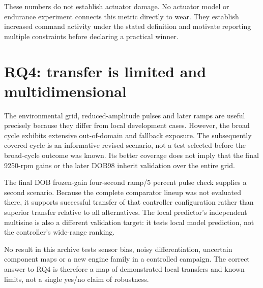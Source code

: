 These numbers do not establish actuator damage. No actuator model or endurance experiment connects this metric directly to wear. They establish increased command activity under the stated definition and motivate reporting multiple constraints before declaring a practical winner.

\section{RQ4: transfer is limited and multidimensional}
The environmental grid, reduced-amplitude pulses and later ramps are useful precisely because they differ from local development cases. However, the broad cycle exhibits extensive out-of-domain and fallback exposure. The subsequently covered cycle is an informative revised scenario, not a test selected before the broad-cycle outcome was known. Its better coverage does not imply that the final 9250-rpm gains or the later DOB98 inherit validation over the entire grid.

The final DOB frozen-gain four-second ramp/5 percent pulse check supplies a second scenario. Because the complete comparator lineup was not evaluated there, it supports successful transfer of that controller configuration rather than superior transfer relative to all alternatives. The local predictor's independent multisine is also a different validation target: it tests local model prediction, not the controller's wide-range ranking.

No result in this archive tests sensor bias, noisy differentiation, uncertain component maps or a new engine family in a controlled campaign. The correct answer to RQ4 is therefore a map of demonstrated local transfers and known limits, not a single yes/no claim of robustness.

